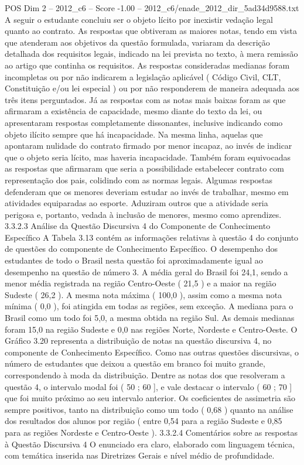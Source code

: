 \begin{textsample}{POS Dim 2 – 2012\_c6 – Score -1.00 – 2012\_c6/enade\_2012\_dir\_5ad34d9588.txt}
A seguir o estudante concluiu ser o objeto lícito por inexistir vedação legal quanto ao contrato.
As respostas que obtiveram as maiores notas, tendo em vista que atenderam aos objetivos da questão formulada, variaram da descrição detalhada dos requisitos legais, indicado na lei prevista no texto, à mera remissão ao artigo que continha os requisitos.
As respostas consideradas medianas foram incompletas ou por não indicarem a legislação aplicável ( Código Civil, CLT, Constituição e/ou lei especial ) ou por não responderem de maneira adequada aos três itens perguntados.
Já as respostas com as notas mais baixas foram as que afirmaram a existência de capacidade, mesmo diante do texto da lei, ou apresentaram respostas completamente dissonantes, inclusive indicando como objeto ilícito sempre que há incapacidade.
Na mesma linha, aquelas que apontaram nulidade do contrato firmado por menor incapaz, ao invés de indicar que o objeto seria lícito, mas haveria incapacidade.
Também foram equivocadas as respostas que afirmaram que seria a possibilidade estabelecer contrato com representação dos pais, colidindo com as normas legais.
Algumas respostas defenderam que os menores deveriam estudar ao invés de trabalhar, mesmo em atividades equiparadas ao esporte.
Aduziram outros que a atividade seria perigosa e, portanto, vedada à inclusão de menores, mesmo como aprendizes. 3.3.2.3 Análise da Questão Discursiva 4 do Componente de Conhecimento Específico A Tabela 3.13 contém as informações relativas à questão 4 do conjunto de questões do componente de Conhecimento Específico.
O desempenho dos estudantes de todo o Brasil nesta questão foi aproximadamente igual ao desempenho na questão de número 3.
A média geral do Brasil foi 24,1, sendo a menor média registrada na região Centro-Oeste ( 21,5 ) e a maior na região Sudeste ( 26,2 ).
A mesma nota máxima ( 100,0 ), assim como a mesma nota mínima ( 0,0 ), foi atingida em todas as regiões, sem exceção.
A mediana para o Brasil como um todo foi 5,0, a mesma obtida na região Sul.
As demais medianas foram 15,0 na região Sudeste e 0,0 nas regiões Norte, Nordeste e Centro-Oeste.
O Gráfico 3.20 representa a distribuição de notas na questão discursiva 4, no componente de Conhecimento Específico.
Como nas outras questões discursivas, o número de estudantes que deixou a questão em branco foi muito grande, correspondendo à moda da distribuição.
Dentre as notas dos que resolveram a questão 4, o intervalo modal foi ( 50 ; 60 ], e vale destacar o intervalo ( 60 ; 70 ] que foi muito próximo ao seu intervalo anterior.
Os coeficientes de assimetria são sempre positivos, tanto na distribuição como um todo ( 0,68 ) quanto na análise dos resultados dos alunos por região ( entre 0,54 para a região Sudeste e 0,85 para as regiões Nordeste e Centro-Oeste ). 3.3.2.4 Comentários sobre as respostas à Questão Discursiva 4 O enunciado era claro, elaborado com linguagem técnica, com temática inserida nas Diretrizes Gerais e nível médio de profundidade.

\end{textsample}
